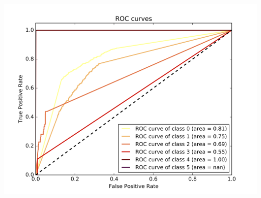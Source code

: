 \documentclass[c]{beamer}
\begin{document}
\begin{frame}
\begin{columns}
\begin{column}{0.6\textwidth}
      \centering\vfill
      \includegraphics[scale=0.18]{../../data/Suisse/test/Nearest_Neighboors_Classification/Nearest_Neighboors_Classification_roc.png}
\end{column}
\end{columns}
\end{frame}
\end{document}
